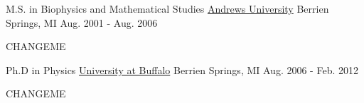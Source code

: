 

\begin{cventries}

  \cventry
    {M.S. in Biophysics and Mathematical Studies} %
    {\href{www.andrews.edu}{Andrews University}} %
    {Berrien Springs, MI} %
    {Aug. 2001 - Aug. 2006} %
    {
      \begin{cvitems} %
        \item {CHANGEME}
      \end{cvitems}
    }

  \cventry
    {Ph.D in Physics} %
    {\href{www.buffalo.edu}{University at Buffalo}} %
    {Berrien Springs, MI} %
    {Aug. 2006 - Feb. 2012} %
    {
      \begin{cvitems} %
        \item {CHANGEME}
      \end{cvitems}
    }

\end{cventries}
